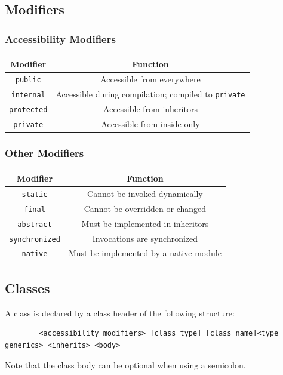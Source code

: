 \documentclass{docs}
\begin{document}
    \subsection{Modifiers}
    
    \subsubsection{Accessibility Modifiers}
    \begin{center}
    \begin{tabular}{c|c}
        Modifier & Function \\
        \hline
        \texttt{public} & Accessible from everywhere \\
        \texttt{internal} & Accessible during compilation; compiled to \texttt{private} \\
        \texttt{protected} & Accessible from inheritors \\
        \texttt{private} & Accessible from inside only
    \end{tabular}
    \end{center}
    
    \subsubsection{Other Modifiers}
    \begin{center}
    \begin{tabular}{c|c}
        Modifier & Function \\
        \hline
        \texttt{static} & Cannot be invoked dynamically \\
        \texttt{final} & Cannot be overridden or changed \\
        \texttt{abstract} & Must be implemented in inheritors \\
        \texttt{synchronized} & Invocations are synchronized \\
        \label{modNative}
        \texttt{native} & Must be implemented by a native module
    \end{tabular}
    \end{center}
    
    \subsection{Classes}
    A class is declared by a class header of the following structure:
    \begin{verbatim}
        <accessibility modifiers> [class type] [class name]<type generics> <inherits> <body>
    \end{verbatim}
    Note that the class body can be optional when using a semicolon.
    
\end{document}
